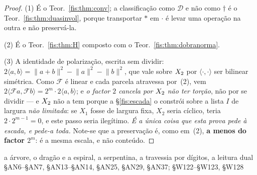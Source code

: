 \documentclass[livro.tex]{subfiles}
\begin{document}
\begin{proof}
(1) É o Teor.~\ref{fis:thm:conv}; a classificação como $\mathcal{D}$ e não como
$\dagger$ é o Teor.~\ref{fis:thm:duasinvol}, porque transportar $\ast$ em
$\cdot$ é levar uma operação na outra e não preservá-la.

(2) É o Teor.~\ref{fis:thm:H} composto com o Teor.~\ref{fis:thm:dobranorma}.

(3) A identidade de polarização, escrita sem dividir: $2\langle a,b\rangle=\lVert
a+b\rVert^{2}-\lVert a\rVert^{2}-\lVert b\rVert^{2}$, que vale sobre $X_2$ por
$\langle\cdot,\cdot\rangle$ ser bilinear simétrica. Como $\mathcal{F}$ é linear e
cada parcela atravessa por~(2), vem
$2\langle\mathcal{F}a,\mathcal{F}b\rangle=2^{m}\cdot2\langle a,b\rangle$; e
\emph{o factor $2$ cancela por $X_2$ não ter torção}, não por se dividir --- e
$X_2$ não a tem porque a §\ref{fis:escada} o constrói sobre a lista $I$ de
largura \emph{não limitada}: se $X_1$ fosse de largura fixa, $X_2$ seria cíclico,
teria $2\cdot2^{m-1}=0$, e este passo seria ilegítimo. \emph{É a única coisa que
esta prova pede à escada, e pede-a toda.} Note-se
que a preservação é, como em~(2), \textbf{a menos do factor $2^{m}$}: é a mesma
escala, e não conteúdo.
\end{proof}
        {a árvore, o dragão e a espiral, a serpentina, a travessia por dígitos, a leitura dual}
        { §AN6--§AN7, §AN13--§AN14, §AN25, §AN29, §AN37;  §W122--§W123, §W128}
\end{document}
